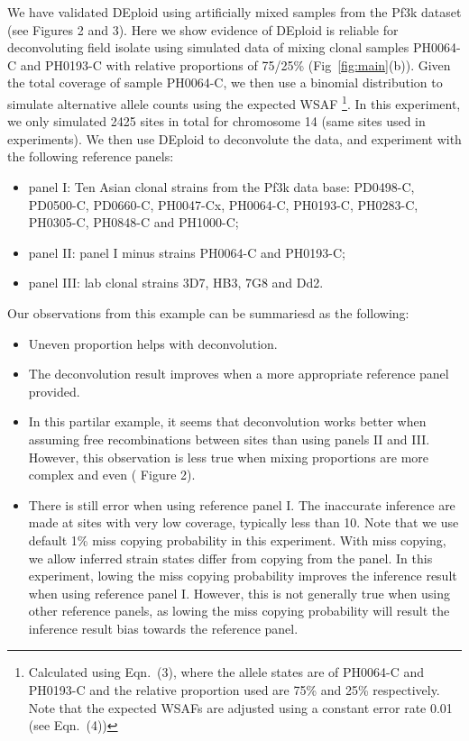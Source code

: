 \documentclass{article}
\begin{document}
We have validated DEploid using artificially mixed samples from the Pf3k dataset (see \citet{Zhu2017} Figures 2 and 3). Here we show evidence of DEploid is reliable for deconvoluting field isolate using simulated data of mixing clonal samples {\textmd PH0064-C} and {\textmd PH0193-C} with relative proportions of 75/25\% (Fig~\ref{fig:main}(b)). Given the total coverage of sample {\textmd PH0064-C}, we then use a binomial distribution to simulate alternative allele counts using the expected WSAF \footnote{Calculated using \citet{Zhu2017} Eqn.~(3), where the allele states are of {\textmd PH0064-C} and {\textmd PH0193-C} and the relative proportion used are 75\% and 25\% respectively. Note that the expected WSAFs are adjusted using a constant error rate 0.01 (see \citet{Zhu2017} Eqn.~(4))}. In this experiment, we only simulated 2425 sites in total for chromosome 14 (same sites used in \citet{Zhu2017} experiments). We then use DEploid to deconvolute the data, and experiment with the following reference panels:
\begin{itemize}
\item panel I: Ten Asian clonal strains from the Pf3k data base: {\textmd PD0498-C}, {\textmd PD0500-C}, {\textmd PD0660-C}, {\textmd PH0047-Cx}, {\textmd PH0064-C}, {\textmd PH0193-C}, {\textmd PH0283-C}, {\textmd PH0305-C}, {\textmd PH0848-C} and {\textmd PH1000-C};
\item panel II: panel I minus strains {\textmd PH0064-C} and {\textmd PH0193-C};
\item panel III: lab clonal strains 3D7, HB3, 7G8 and Dd2.
\end{itemize}

Our observations from this example can be summariesd as the following:
\begin{itemize}
\item Uneven proportion helps with deconvolution.
\item The deconvolution result improves when a more appropriate reference panel provided.
\item In this partilar example, it seems that deconvolution works better when assuming free recombinations between sites than using panels II and III. However, this observation is less true when mixing proportions are more complex and even (\citet{Zhu2017} Figure 2).
\item There is still error when using reference panel I. The inaccurate inference are made at sites with very low coverage, typically less than 10. Note that we use default 1\% miss copying probability in this experiment. With miss copying, we allow inferred strain states differ from copying from the panel. In this experiment, lowing the miss copying probability improves the inference result when using reference panel I. However, this is not generally true when using other reference panels, as lowing the miss copying probability will result the inference result bias towards the reference panel.
\end{itemize}
\end{document}

